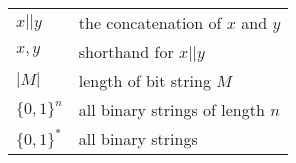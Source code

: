 \begin{table*}[!h]
{\renewcommand{\arraystretch}{1.3} %
  \begin{tabular}{p{1 in}  l}
    $x||y$		& the concatenation of $x$ and $y$ \\
    $x,y$		& shorthand for $x||y$ \\
    $|M|$		& length of bit string $M$ \\
    $\{0,1\}^n$	& all binary strings of length $n$ \\
    $\{0,1\}^*$	& all binary strings
  \end{tabular}
}
\end{table*}
